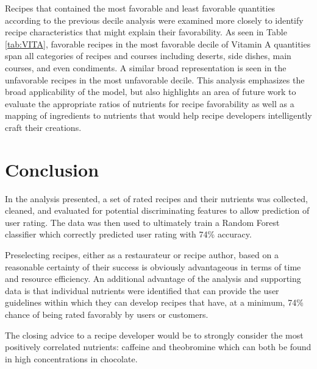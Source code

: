 \documentclass[]{scrartcl}
\begin{document}
Recipes that contained the most favorable and least favorable quantities according to the previous decile analysis were examined more closely to identify recipe characteristics that might explain their favorability.  As seen in Table \ref{tab:VITA}, favorable recipes in the most favorable decile of Vitamin A quantities span all categories of recipes and courses including deserts, side dishes, main courses, and even condiments.  A similar broad representation is seen in the unfavorable recipes in the most unfavorable decile.  This analysis emphasizes the broad applicability of the model, but also highlights an area of future work to evaluate the appropriate ratios of nutrients for recipe favorability as well as a mapping of ingredients to nutrients that would help recipe developers intelligently craft their creations.

\section*{Conclusion}

In the analysis presented, a set of rated recipes and their nutrients was collected, cleaned, and evaluated for potential discriminating features to allow prediction of user rating.  The data was then used to ultimately train a Random Forest classifier which correctly predicted user rating with 74\% accuracy.  

Preselecting recipes, either as a restaurateur or recipe author, based on a reasonable certainty of their success is obviously advantageous in terms of time and resource efficiency.  An additional advantage of the analysis and supporting data is that individual nutrients were identified that can provide the user guidelines within which they can develop recipes that have, at a minimum, 74\% chance of being rated favorably by users or customers.  

The closing advice to a recipe developer would be to strongly consider the most positively correlated nutrients: caffeine and theobromine which can both be found in high concentrations in chocolate.

\pagebreak
\end{document}
